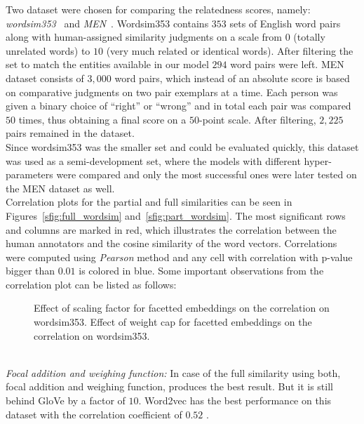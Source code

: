Two dataset were chosen for comparing the relatedness scores, namely: \emph{wordsim353}~\cite{Finkelstein:2001:PSC:371920.372094} and \emph{MEN}~\cite{Bruni:2014:MDS:2655713.2655714}. Wordsim353 contains $353$ sets of English word pairs along with human-assigned similarity judgments on a scale from $0$ (totally unrelated words) to $10$ (very much related or identical words). After filtering the set to match the entities available in our model $294$ word pairs were left. MEN dataset consists of
$3,000$ word pairs, which instead of an absolute score is based on comparative judgments on two pair exemplars at a time. Each person was given a binary choice of ``right'' or ``wrong'' and in total each pair was compared $50$ times, thus obtaining a final score on a $50$-point scale. After filtering, $2,225$ pairs remained in the dataset.\\
Since wordsim353 was the smaller set and could be evaluated quickly, this dataset was used as a semi-development set, where the models with different hyper-parameters were compared and only the most successful ones were later tested on the MEN dataset as well. \\
Correlation plots for the partial and full similarities can be seen in Figures~\ref{sfig:full_wordsim} and~\ref{sfig:part_wordsim}. The most significant rows and columns are marked in red, which illustrates the correlation between the human annotators and the cosine similarity of the word vectors. Correlations were computed using \emph{Pearson} method and any cell with correlation with p-value bigger than $0.01$ is colored in blue.
Some important observations from the correlation plot can be listed as follows:\\
\begin{figure}[hb]
\centering
\subcaptionbox{\label{sfig:scaling_f}}{
\resizebox{0.45\textwidth}{0.30\textwidth}{      

}}
\subcaptionbox{\label{sfig:weight_cap}}{\resizebox{0.45\textwidth}{0.30\textwidth}{      

}}

\caption{ Effect of scaling factor for facetted embeddings on the correlation on wordsim353.  Effect of weight cap for facetted embeddings on the correlation on wordsim353.}
\label{fig:correlation_change}
\end{figure}
\\
\emph{Focal addition and weighing function:} In case of the full similarity using both, focal addition and weighing function, produces the best result. But it is still behind GloVe by a factor of $10$. Word2vec has the best performance on this dataset with the correlation coefficient of $0.52$ .
